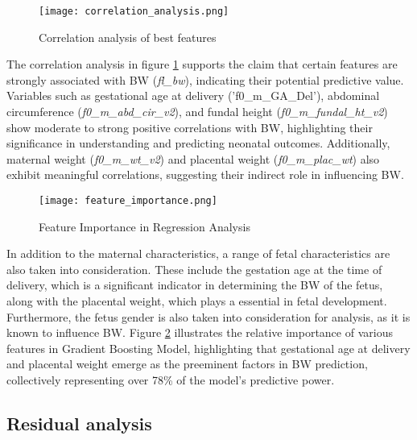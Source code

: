 \documentclass[12pt]{article}
\begin{document}
\begin{figure}[H]
    \centering
    \texttt{[image: correlation\_analysis.png]} %
    \caption{Correlation analysis of best features}
    \label{fig:correlation analysis}
\end{figure}

The correlation analysis in figure \ref{fig:correlation analysis} supports the claim that certain features are strongly associated with BW (\textit{fl\_bw}), indicating their potential predictive value. Variables such as gestational age at delivery ('f0\_m\_GA\_Del'), abdominal circumference (\textit{f0\_m\_abd\_cir\_v2}), and fundal height (\textit{f0\_m\_fundal\_ht\_v2}) show moderate to strong positive correlations with BW, highlighting their significance in understanding and predicting neonatal outcomes. Additionally, maternal weight (\textit{f0\_m\_wt\_v2}) and placental weight (\textit{f0\_m\_plac\_wt}) also exhibit meaningful correlations, suggesting their indirect role in influencing BW. 


\begin{figure}[H]
    \centering
    \texttt{[image: feature\_importance.png]} %
    \caption{Feature Importance in Regression Analysis}
    \label{fig:feature_importance}
\end{figure}

In addition to the maternal characteristics, a range of fetal characteristics are also taken into consideration. These include the gestation age at the time of delivery, which is a significant indicator in determining the BW of the fetus, along with the placental weight, which plays a essential in fetal development. Furthermore, the fetus gender is also taken into consideration for analysis, as it is known to influence BW. 
Figure \ref{fig:feature_importance} illustrates the relative importance of various features in Gradient Boosting Model, highlighting that gestational age at delivery and placental weight emerge as the preeminent factors in BW prediction, collectively representing over 78\% of the model's predictive power.

\subsection{Residual analysis}
\end{document}
